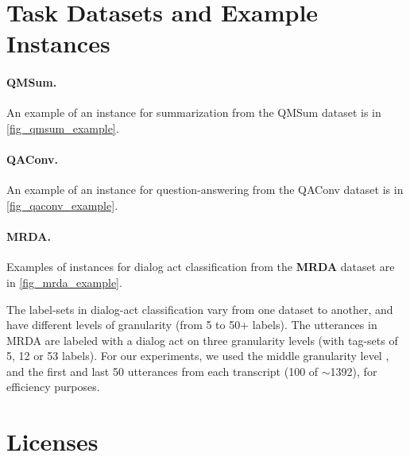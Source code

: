 












\section{Task Datasets and Example Instances}
\label{sec_appendix_datasets}

\paragraph{QMSum.}
An example of an instance for summarization from the QMSum dataset is in \autoref{fig_qmsum_example}.

\paragraph{QAConv.}
An example of an instance for question-answering from the QAConv dataset is in \autoref{fig_qaconv_example}.

\paragraph{MRDA.}
Examples of instances for dialog act classification from the \textbf{MRDA} dataset are in \autoref{fig_mrda_example}.

The label-sets in dialog-act classification vary from one dataset to another, and have different levels of granularity (from 5 to 50+ labels). The utterances in MRDA are labeled with a dialog act on three granularity levels (with tag-sets of 5, 12 or 53 labels). For our experiments, we used the middle granularity level \citep[tagset with 12 dialog acts;][]{dhillon2004mrdaLabeling}, and the first and last 50 utterances from each transcript (100 of $\sim$1392), for efficiency purposes.









\section{Licenses}

